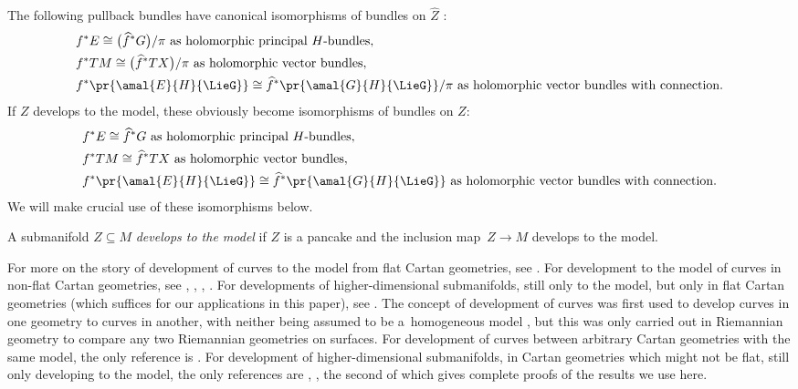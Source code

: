 The following pullback bundles have canonical isomorphisms of bundles on $\hat{Z}$ \cite[Section~2.3]{Biswas.McKay:2016}:
\begin{gather*}
\begin{split}
&f^* E \cong \big(\widehat{f}^* G\big)/\pi \text{ as holomorphic principal $H$-bundles}, \\
&f^* TM \cong \big(\widehat{f}^* TX\big)/\pi \text{ as holomorphic vector bundles}, \\
&f^* \pr{\amal{E}{H}{\LieG}} \cong \widehat{f}^* \pr{\amal{G}{H}{\LieG}}/\pi \text{ as holomorphic vector bundles with connection}.
\end{split}
\end{gather*}
If $Z$ develops to the model, these obviously become isomorphisms of bundles on $Z$:
\begin{gather*}
\begin{split}
&f^* E \cong \widehat{f}^* G \text{ as holomorphic principal $H$-bundles}, \\
&f^* TM \cong \widehat{f}^* TX \text{ as holomorphic vector bundles}, \\
&f^* \pr{\amal{E}{H}{\LieG}} \cong \widehat{f}^* \pr{\amal{G}{H}{\LieG}} \text{ as holomorphic vector bundles with connection}.
\end{split}
\end{gather*}
We will make crucial use of these isomorphisms below.

A submanifold $Z\subseteq M$ \emph{develops to the model} if $Z$ is a pancake and the inclusion map~${Z\!\to\! M}$ develops to the model.

For more on the story of development of curves to the model from flat Cartan geometries, see \cite[p.~3]{Goldman:2010}. For development to the model of curves in non-flat Cartan geometries, see
\cite[p.~108, 1.5.17]{Cap/Slovak:2009}, \cite[p.~54, 41X]{Cartan1935}, \cite{Ehresmann:1951}, \cite[p.~368]{Sharpe:1997}. For developments of higher-dimensional submanifolds, still only to the model, but only
in flat Cartan geometries (which suffices for our applications in this paper), see
\cite[Section~4]{KobayashiOchiai:1980}. The concept of development of curves was first used to develop
curves in one geometry to curves in another, with neither being assumed to be a~homogeneous model
\cite{Rinow1932}, but this was only carried out in Riemannian geometry to compare any two Riemannian
geometries on surfaces. For development of curves between arbitrary Cartan geometries with the same model,
the only reference is \cite[Section~17]{mckay2023introduction}. For development of higher-dimensional
submanifolds, in Cartan geometries which might not be flat, still only developing to the model, the only
references are \cite[Section~2.3]{Biswas.McKay:2016}, \cite[p.~43]{mckay2023introduction}, the second of
which gives complete proofs of the results we use here.


